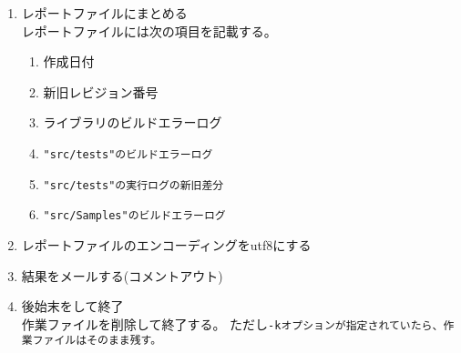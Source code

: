 \begin{enumerate}
  \item	レポートファイルにまとめる\\
	レポートファイルには次の項目を記載する。
	\begin{narrow}
		\begin{enumerate}
		  \item	作成日付
		  \item	新旧レビジョン番号
		  \item	ライブラリのビルドエラーログ
		  \item	\tt{"src/tests"}のビルドエラーログ
		  \item	\tt{"src/tests"}の実行ログの新旧差分
		  \item	\tt{"src/Samples"}のビルドエラーログ
		\end{enumerate}
	\end{narrow}

  \item	レポートファイルのエンコーディングをutf8にする

  \item	結果をメールする(コメントアウト)

  \item	後始末をして終了\\
	作業ファイルを削除して終了する。
	ただし\tt{-k}オプションが指定されていたら、作業ファイルはそのまま残す。

\end{enumerate}

